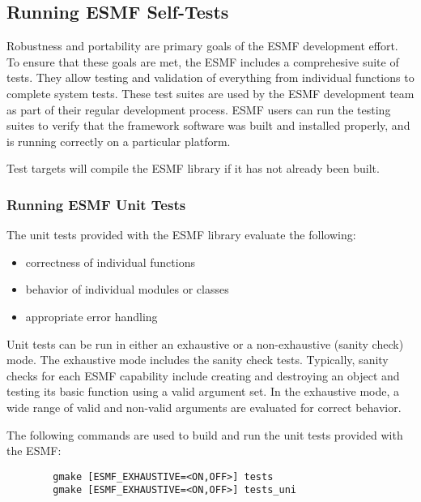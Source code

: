 
\subsection{Running ESMF Self-Tests}
\label{testing}

Robustness and portability are primary goals of the ESMF development
effort.  To ensure that these goals are met, the ESMF includes a
comprehesive suite of tests.  They allow testing and validation of
everything from individual functions to complete system tests.  These
test suites are used by the ESMF development team as part of their
regular development process.  ESMF users can run the testing suites to
verify that the framework software was built and installed properly,
and is running correctly on a particular platform.

Test targets will compile the ESMF library if it has not already been built.

\subsubsection{Running ESMF Unit Tests}

\label{UnitTestDescription}
The unit tests provided with the ESMF library evaluate the following:
\begin{itemize}
\item correctness of individual functions
\item behavior of individual modules or classes
\item appropriate error handling
\end{itemize}

Unit tests can be run in either an exhaustive or a non-exhaustive (sanity check)
mode.  The exhaustive mode includes the sanity check tests.  Typically, sanity
checks for each ESMF capability include creating and destroying an object and 
testing its basic function using a valid argument set.  In the exhaustive mode,
a wide range of valid and non-valid arguments are evaluated for correct behavior.

\label{RunUnitTests}

The following commands are used to build and run the unit tests provided with 
the ESMF:
\begin{verbatim}
        gmake [ESMF_EXHAUSTIVE=<ON,OFF>] tests
        gmake [ESMF_EXHAUSTIVE=<ON,OFF>] tests_uni
\end{verbatim}


